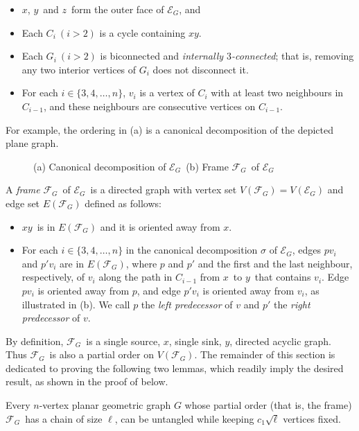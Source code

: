 \documentclass[lotsofwhite,charterfonts, letter]{patmorin}
\newcommand{\eg}{\ensuremath{\mathcal{E}_G}}
\newcommand{\fg}{\ensuremath{\mathcal{F}_G}}
\newcommand{\xx}{\ensuremath{x}}
\newcommand{\yy}{\ensuremath{y}}
\newcommand{\zz}{\ensuremath{z}}
\begin{document}
\begin{itemize}
\item \xx, \yy\ and \zz\ form the outer face of \eg, and 
\item Each $C_i \ ( i>2)$ is a cycle containing $\xx\yy$.
\item Each $G_i \ ( i>2)$ is biconnected and \emph{internally $3$-connected}; that is, removing any two interior vertices of $G_i$ does not disconnect it.
\item For each $i\in\{3,4,\dots,n\}$, $v_i$ is a vertex of $C_i$ with at least two neighbours in $C_{i-1}$, and these neighbours are consecutive vertices on $C_{i-1}$.
\end{itemize}
For example, the ordering in (a) is a canonical decomposition of the depicted plane graph.
%
\begin{figure}[htb]
\begin{center}
\caption{ (a) Canonical decomposition of \eg\ (b) Frame \fg\ of \eg}
\end{center}
\end{figure}
%

A \emph{frame} \fg\ of \eg\ is a directed graph with vertex set $V(\fg)=V(\eg)$ and edge set $E(\fg)$ defined as follows: 
\begin{itemize}
\item \xx\yy\ is in $E(\fg)$ and it is oriented away from \xx.
\item For each $i\in\{3,4,\dots,n\}$ in the canonical decomposition $\sigma$ of \eg, edges $pv_i$ and $p'v_i$ are in $E(\fg)$, where $p$ and $p'$ and the first and the last neighbour, respectively, of $v_i$ along the path in $C_{i-1}$ from \xx\ to \yy\ that contains $v_i$. Edge $pv_i$ is oriented away from $p$, and edge $p'v_i$ is oriented away from $v_i$, as illustrated in (b). We call $p$ the \emph{left predecessor} of $v$ and $p'$ the \emph{right predecessor} of $v$.
\end{itemize}



By definition, \fg\ is a single source, \xx, single sink, \yy,
directed acyclic graph. Thus \fg\ is also a partial order on $V(\fg)$.
The remainder of this section is dedicated to proving the following two lemmas, which readily imply the desired result, as shown in the proof of  below.

\begin{lem}
Every $n$-vertex planar geometric graph $G$ whose partial order (that is, the frame) \fg\ has a chain of size $\ell$, can be untangled while keeping $c_1\sqrt{\ell}$ vertices fixed.
\end{lem}
\end{document}
